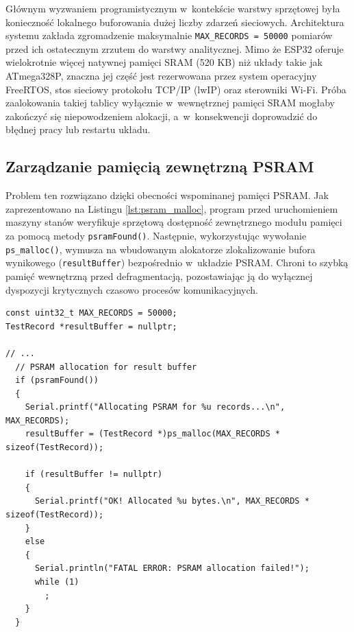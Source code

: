 Głównym wyzwaniem programistycznym w~kontekście warstwy sprzętowej była konieczność lokalnego buforowania dużej liczby zdarzeń sieciowych.
Architektura systemu zakłada zgromadzenie maksymalnie \texttt{MAX\_RECORDS = 50000} pomiarów przed ich ostatecznym zrzutem do warstwy analitycznej.
Mimo że ESP32 oferuje wielokrotnie więcej natywnej pamięci SRAM (520 KB) niż układy takie jak ATmega328P, znaczna jej część jest rezerwowana przez system operacyjny FreeRTOS, stos sieciowy protokołu TCP/IP (lwIP) oraz sterowniki Wi-Fi.
Próba zaalokowania takiej tablicy wyłącznie w~wewnętrznej pamięci SRAM mogłaby zakończyć się niepowodzeniem alokacji, a~w~konsekwencji doprowadzić do błędnej pracy lub restartu układu.

\subsection{Zarządzanie pamięcią zewnętrzną PSRAM}
\label{psram}

Problem ten rozwiązano dzięki obecności wspominanej pamięci PSRAM.
Jak zaprezentowano na Listingu \ref{lst:psram_malloc}, program przed uruchomieniem maszyny stanów weryfikuje sprzętową dostępność zewnętrznego modułu pamięci za pomocą metody \texttt{psramFound()}.
Następnie, wykorzystując wywołanie \texttt{ps\_malloc()}, wymusza na wbudowanym alokatorze zlokalizowanie bufora wynikowego (\texttt{resultBuffer}) bezpośrednio w~układzie PSRAM.
Chroni to szybką pamięć wewnętrzną przed defragmentacją, pozostawiając ją do wyłącznej dyspozycji krytycznych czasowo procesów komunikacyjnych.

\begin{listing}[htbp]
    \caption{Wymuszona alokacja bufora pomiarowego w~pamięci PSRAM (\texttt{main.cpp}) \cite{espy_nexus_esp32_firmware}.}
    \label{lst:psram_malloc}
    \begin{verbatim}
const uint32_t MAX_RECORDS = 50000;
TestRecord *resultBuffer = nullptr;

// ...
  // PSRAM allocation for result buffer
  if (psramFound())
  {
    Serial.printf("Allocating PSRAM for %u records...\n", MAX_RECORDS);
    resultBuffer = (TestRecord *)ps_malloc(MAX_RECORDS * sizeof(TestRecord));

    if (resultBuffer != nullptr)
    {
      Serial.printf("OK! Allocated %u bytes.\n", MAX_RECORDS * sizeof(TestRecord));
    }
    else
    {
      Serial.println("FATAL ERROR: PSRAM allocation failed!");
      while (1)
        ;
    }
  }
\end{verbatim}
\end{listing}

